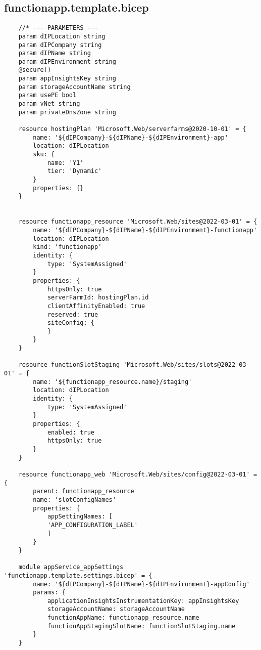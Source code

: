 \documentclass[dutch,dit,thesis]{hogentreport}
\begin{document}
\subsection{functionapp.template.bicep}
\label{sec:functionapp.template.bicep}
\begin{lstlisting}
    //* --- PARAMETERS ---
    param dIPLocation string
    param dIPCompany string
    param dIPName string
    param dIPEnvironment string
    @secure()
    param appInsightsKey string
    param storageAccountName string
    param usePE bool
    param vNet string
    param privateDnsZone string

    resource hostingPlan 'Microsoft.Web/serverfarms@2020-10-01' = {
        name: '${dIPCompany}-${dIPName}-${dIPEnvironment}-app'
        location: dIPLocation
        sku: {
            name: 'Y1'
            tier: 'Dynamic'
        }
        properties: {}
    }


    resource functionapp_resource 'Microsoft.Web/sites@2022-03-01' = {
        name: '${dIPCompany}-${dIPName}-${dIPEnvironment}-functionapp'
        location: dIPLocation
        kind: 'functionapp'
        identity: {
            type: 'SystemAssigned'
        }
        properties: {
            httpsOnly: true
            serverFarmId: hostingPlan.id
            clientAffinityEnabled: true
            reserved: true
            siteConfig: {
            }
        }
    }

    resource functionSlotStaging 'Microsoft.Web/sites/slots@2022-03-01' = {
        name: '${functionapp_resource.name}/staging'
        location: dIPLocation
        identity: {
            type: 'SystemAssigned'
        }
        properties: {
            enabled: true
            httpsOnly: true
        }
    }

    resource functionapp_web 'Microsoft.Web/sites/config@2022-03-01' = {
        parent: functionapp_resource
        name: 'slotConfigNames'
        properties: {
            appSettingNames: [
            'APP_CONFIGURATION_LABEL'
            ]
        }
    }

    module appService_appSettings 'functionapp.template.settings.bicep' = {
        name: '${dIPCompany}-${dIPName}-${dIPEnvironment}-appConfig'
        params: {
            applicationInsightsInstrumentationKey: appInsightsKey
            storageAccountName: storageAccountName
            functionAppName: functionapp_resource.name
            functionAppStagingSlotName: functionSlotStaging.name
        }
    }


\end{lstlisting}
\end{document}
